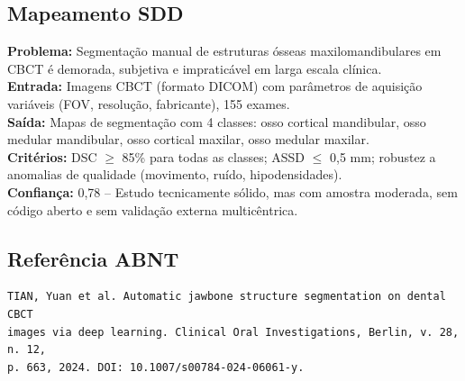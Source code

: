 \subsection{Mapeamento SDD}
\textbf{Problema:} Segmentação manual de estruturas ósseas maxilomandibulares
em CBCT é demorada, subjetiva e impraticável em larga escala clínica. \\
\textbf{Entrada:} Imagens CBCT (formato DICOM) com parâmetros de aquisição
variáveis (FOV, resolução, fabricante), 155 exames. \\
\textbf{Saída:} Mapas de segmentação com 4 classes: osso cortical mandibular,
osso medular mandibular, osso cortical maxilar, osso medular maxilar. \\
\textbf{Critérios:} DSC $\geq$ 85\% para todas as classes; ASSD $\leq$ 0,5 mm;
robustez a anomalias de qualidade (movimento, ruído, hipodensidades). \\
\textbf{Confiança:} 0,78 -- Estudo tecnicamente sólido, mas com amostra
moderada, sem código aberto e sem validação externa multicêntrica.

\subsection{Referência ABNT}
\begin{verbatim}
TIAN, Yuan et al. Automatic jawbone structure segmentation on dental CBCT
images via deep learning. Clinical Oral Investigations, Berlin, v. 28, n. 12,
p. 663, 2024. DOI: 10.1007/s00784-024-06061-y.
\end{verbatim}
